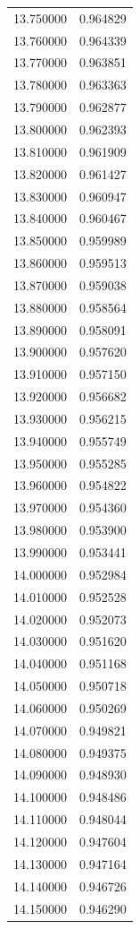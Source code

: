 \begin{tabular}{rr}
13.750000 & 0.964829 \\
13.760000 & 0.964339 \\
13.770000 & 0.963851 \\
13.780000 & 0.963363 \\
13.790000 & 0.962877 \\
13.800000 & 0.962393 \\
13.810000 & 0.961909 \\
13.820000 & 0.961427 \\
13.830000 & 0.960947 \\
13.840000 & 0.960467 \\
13.850000 & 0.959989 \\
13.860000 & 0.959513 \\
13.870000 & 0.959038 \\
13.880000 & 0.958564 \\
13.890000 & 0.958091 \\
13.900000 & 0.957620 \\
13.910000 & 0.957150 \\
13.920000 & 0.956682 \\
13.930000 & 0.956215 \\
13.940000 & 0.955749 \\
13.950000 & 0.955285 \\
13.960000 & 0.954822 \\
13.970000 & 0.954360 \\
13.980000 & 0.953900 \\
13.990000 & 0.953441 \\
14.000000 & 0.952984 \\
14.010000 & 0.952528 \\
14.020000 & 0.952073 \\
14.030000 & 0.951620 \\
14.040000 & 0.951168 \\
14.050000 & 0.950718 \\
14.060000 & 0.950269 \\
14.070000 & 0.949821 \\
14.080000 & 0.949375 \\
14.090000 & 0.948930 \\
14.100000 & 0.948486 \\
14.110000 & 0.948044 \\
14.120000 & 0.947604 \\
14.130000 & 0.947164 \\
14.140000 & 0.946726 \\
14.150000 & 0.946290 \\

\end{tabular}
